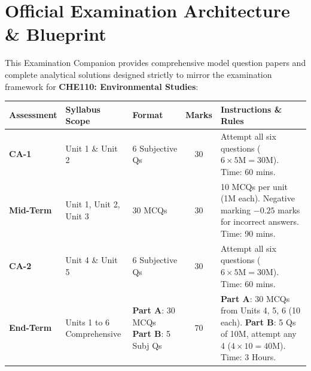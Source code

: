 \chapter*{Official Examination Architecture \& Blueprint}

This Examination Companion provides comprehensive model question papers and complete analytical solutions designed strictly to mirror the examination framework for \textbf{CHE110: Environmental Studies}:

\begin{center}
\begin{tabularx}{\textwidth}{l p{3.2cm} p{2.8cm} c X}
\toprule
\textbf{Assessment} & \textbf{Syllabus Scope} & \textbf{Format} & \textbf{Marks} & \textbf{Instructions \& Rules} \\
\midrule
\textbf{CA-1} & Unit 1 \& Unit 2 & 6 Subjective Qs & 30 & Attempt all six questions ($6 \times 5\text{M} = 30\text{M}$). Time: 60 mins. \\
\addlinespace
\textbf{Mid-Term} & Unit 1, Unit 2, Unit 3 & 30 MCQs & 30 & 10 MCQs per unit (1M each). Negative marking $-0.25$ marks for incorrect answers. Time: 90 mins. \\
\addlinespace
\textbf{CA-2} & Unit 4 \& Unit 5 & 6 Subjective Qs & 30 & Attempt all six questions ($6 \times 5\text{M} = 30\text{M}$). Time: 60 mins. \\
\addlinespace
\textbf{End-Term} & Units 1 to 6 Comprehensive & \textbf{Part A}: 30 MCQs \newline \textbf{Part B}: 5 Subj Qs & 70 & \textbf{Part A}: 30 MCQs from Units 4, 5, 6 (10 each). \newline \textbf{Part B}: 5 Qs of 10M, attempt any 4 ($4 \times 10 = 40\text{M}$). Time: 3 Hours. \\
\bottomrule
\end{tabularx}
\end{center}

\newpage
